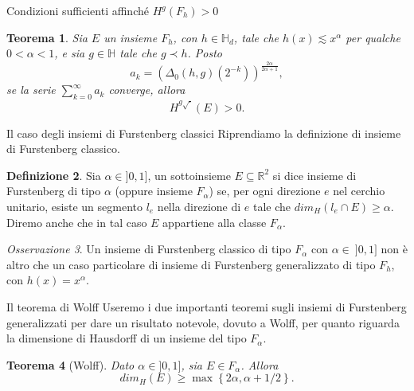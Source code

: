 \documentclass[intlimits]{beamer}
\numberwithin{equation}{section}
\theoremstyle{plain}
\newtheorem{teor}{Teorema}[section]
\theoremstyle{definition}
\newtheorem{defin}[teor]{Definizione}
\theoremstyle{remark}
\newtheorem{oss}[teor]{Osservazione}
\newcommand{\gra}[1]{\left\{#1\right\}}
\renewcommand{\geq}{\geqslant}
\begin{document}
\begin{frame}{Condizioni sufficienti affinché $H^g(F_h)>0$}
\begin{teor} Sia $E$ un insieme $F_h$, con $h \in \mathbb{H}_d$, tale che $h(x) \lesssim x^\alpha$ per qualche 
$0< \alpha <1$, e sia $g \in \mathbb{H}$ tale che $g \prec h$. \pause 
  Posto \[a_k= (\Delta_0(h,g)(2^{-k}))^{\frac{2\alpha}{2\alpha+1}},\] 
se la serie $\sum_{k=0}^\infty a_k$ converge, \pause
allora \[H^{g \sqrt{\cdot}}(E)>0. \]
\end{teor}
\end{frame}


\begin{frame}{Il caso degli insiemi di Furstenberg classici}
Riprendiamo la definizione di insieme di Furstenberg classico.\\
\begin{defin}Sia $\alpha \in ]0,1]$, un sottoinsieme $E\subseteq \mathbb{R}^2$ si dice insieme di Furstenberg di 
tipo $\alpha$ (oppure insieme $F_\alpha$) se, per ogni direzione $e$ 
nel cerchio unitario, esiste un segmento $l_e$ nella direzione di $e$ tale che
$dim_H(l_e \cap E) \geq \alpha$. Diremo anche che in tal caso $E$ appartiene alla classe $F_\alpha$.\end{defin}
\pause \begin{oss}
Un insieme di Furstenberg classico di tipo $F_\alpha$ con $\alpha \in \ ]0,1]$ non è altro che un 
caso particolare di insieme di Furstenberg generalizzato
di tipo $F_h$, con $h(x)= x^\alpha$. \end{oss}
\end{frame}


\begin{frame}{Il teorema di Wolff}
Useremo i due importanti teoremi sugli insiemi di Furstenberg generalizzati per dare un risultato notevole,
dovuto a Wolff, per quanto riguarda la dimensione di Hausdorff di un insieme del tipo $F_\alpha$.\pause
\bigskip
\begin{teor}[Wolff] Dato $\alpha \in ]0,1]$, sia $E \in F_\alpha$. \pause Allora
\[dim_H(E) \geq \max\gra{2\alpha,\alpha + 1/2}.\] \end{teor}
\end{frame}
\end{document}
